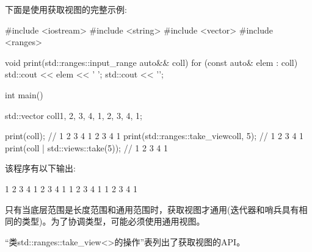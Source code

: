 下面是使用获取视图的完整示例:


\begin{cpp}
#include <iostream>
#include <string>
#include <vector>
#include <ranges>

void print(std::ranges::input_range auto&& coll)
{
	for (const auto& elem : coll) {
		std::cout << elem << ' ';
	}
	std::cout << '\n';
}

int main()
{
	std::vector coll{1, 2, 3, 4, 1, 2, 3, 4, 1};
	
	print(coll); // 1 2 3 4 1 2 3 4 1
	print(std::ranges::take_view{coll, 5}); // 1 2 3 4 1
	print(coll | std::views::take(5)); // 1 2 3 4 1
}
\end{cpp}

该程序有以下输出:

\begin{shell}
1 2 3 4 1 2 3 4 1
1 2 3 4 1
1 2 3 4 1
\end{shell}


只有当底层范围是长度范围和通用范围时，获取视图才通用(迭代器和哨兵具有相同的类型)。为了协调类型，可能必须使用通用视图。


“类std::ranges::take\_view<>的操作”表列出了获取视图的API。


